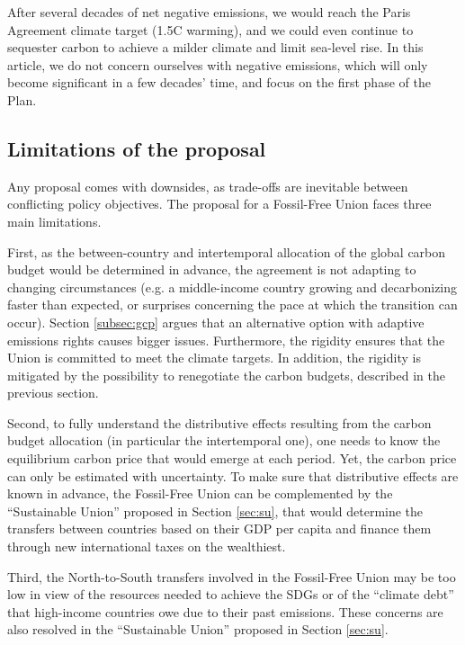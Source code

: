 \documentclass[12pt,english]{article}
\begin{document}
After several decades of net negative emissions, we would reach the Paris Agreement climate target (1.5\textdegree{}C warming), and we could even continue to sequester carbon to achieve a milder climate and limit sea-level rise. In this article, we do not concern ourselves with negative emissions, which will only become significant in a few decades' time, and focus on the first phase of the Plan. 


\subsection{Limitations of the proposal\label{subsec:limitation}}

Any proposal comes with downsides, as trade-offs are inevitable between conflicting policy objectives. The proposal for a Fossil-Free Union faces three main limitations. 

First, as the between-country and intertemporal allocation of the global carbon budget would be determined in advance, the agreement is not adapting to changing circumstances (e.g. a middle-income country growing and decarbonizing faster than expected, or surprises concerning the pace at which the transition can occur). Section \ref{subsec:gcp} argues that an alternative option with adaptive emissions rights causes bigger issues. Furthermore, the rigidity ensures that the Union is committed to meet the climate targets. In addition, the rigidity is mitigated by the possibility to renegotiate the carbon budgets, described in the previous section. 

Second, to fully understand the distributive effects resulting from the carbon budget allocation (in particular the intertemporal one), one needs to know the equilibrium carbon price that would emerge at each period. Yet, the carbon price can only be estimated with uncertainty. To make sure that distributive effects are known in advance, the Fossil-Free Union can be complemented by the ``Sustainable Union'' proposed in Section \ref{sec:su}, that would determine the transfers between countries based on their GDP per capita and finance them through new international taxes on the wealthiest.

Third, the North-to-South transfers involved in the Fossil-Free Union may be too low in view of the resources needed to achieve the SDGs or of the ``climate debt'' that high-income countries owe due to their past emissions. These concerns are also resolved in the ``Sustainable Union'' proposed in Section \ref{sec:su}.
\end{document}
